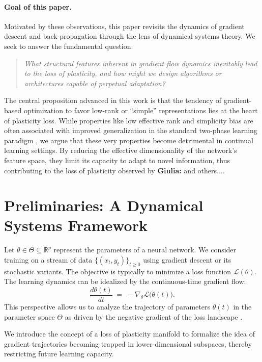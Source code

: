 \documentclass{article}
\newcommand{\Loss}{\mathcal{L}}
\newcommand{\R}{\mathbb{R}}
\newcommand{\giulia}[1]{{\color{ForestGreen}\textbf{Giulia:} #1}}
\begin{document}
\paragraph{Goal of this paper.}
Motivated by these observations, this paper revisits the dynamics of gradient descent and back-propagation through the lens of dynamical systems theory. We seek to answer the fundamental question:
\begin{quote}
\emph{What structural features inherent in gradient flow dynamics inevitably lead to the loss of plasticity, and how might we design algorithms or architectures capable of perpetual adaptation?}
\end{quote}
The central proposition advanced in this work is that the tendency of gradient-based optimization to favor low-rank or ``simple'' representations lies at the heart of plasticity loss. While properties like low effective rank and simplicity bias are often associated with improved generalization in the standard two-phase learning paradigm \cite{huh2022lowrank, papyan2020prevalence, zhang2017understanding}, we argue that these very properties become detrimental in continual learning settings. By reducing the effective dimensionality of the network's feature space, they limit its capacity to adapt to novel information, thus contributing to the loss of plasticity observed by \cite{dohare2024loss} \giulia{and others...}.

\section{Preliminaries: A Dynamical Systems Framework}
\label{sec:framework}

Let $\theta\in\Theta\subseteq\R^p$ represent the parameters of a neural network. We consider training on a stream of data $\{(x_t,y_t)\}_{t\ge0}$ using gradient descent or its stochastic variants. The objective is typically to minimize a loss function $\Loss(\theta)$. The learning dynamics can be idealized by the continuous-time gradient flow:
\begin{equation}
    \frac{d\theta(t)}{dt} \;=\; -\nabla_\theta\Loss\bigl(\theta(t)\bigr).
    \label{eq:grad_flow}
\end{equation}
This perspective allows us to analyze the trajectory of parameters $\theta(t)$ in the parameter space $\Theta$ as driven by the negative gradient of the loss landscape \cite{saxe2014exact}.

We introduce the concept of a loss of plasticity manifold to formalize the idea of gradient trajectories becoming trapped in lower-dimensional subspaces, thereby restricting future learning capacity.
\end{document}
